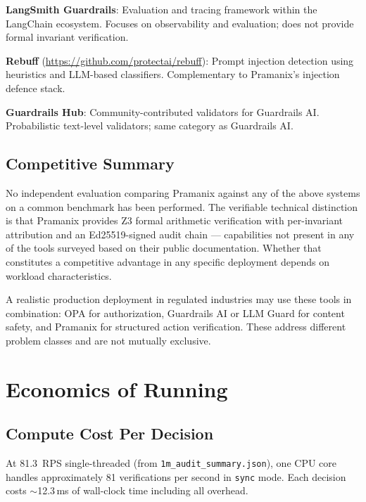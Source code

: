 \documentclass[12pt,a4paper,oneside]{report}
\newcommand{\fname}[1]{\texttt{#1}}          %
\newcommand{\code}[1]{\texttt{#1}}           %
\begin{document}
\textbf{LangSmith Guardrails}: Evaluation and tracing framework within the
LangChain ecosystem.  Focuses on observability and evaluation; does not
provide formal invariant verification.

\textbf{Rebuff} (\url{https://github.com/protectai/rebuff}): Prompt injection
detection using heuristics and LLM-based classifiers.  Complementary to
Pramanix's injection defence stack.

\textbf{Guardrails Hub}: Community-contributed validators for Guardrails AI.
Probabilistic text-level validators; same category as Guardrails AI.

\section{Competitive Summary}

No independent evaluation comparing Pramanix against any of the above systems
on a common benchmark has been performed.  The verifiable technical
distinction is that Pramanix provides Z3 formal arithmetic verification with
per-invariant attribution and an Ed25519-signed audit chain --- capabilities
not present in any of the tools surveyed based on their public documentation.
Whether that constitutes a competitive advantage in any specific deployment
depends on workload characteristics.

A realistic production deployment in regulated industries may use these tools
in combination: OPA for authorization, Guardrails AI or LLM Guard for content
safety, and Pramanix for structured action verification.  These address
different problem classes and are not mutually exclusive.

\chapter{Economics of Running}

\section{Compute Cost Per Decision}

At 81.3~RPS single-threaded (from \fname{1m\_audit\_summary.json}), one CPU
core handles approximately 81 verifications per second in \code{sync} mode.
Each decision costs $\sim$12.3\,ms of wall-clock time including all overhead.
\end{document}
